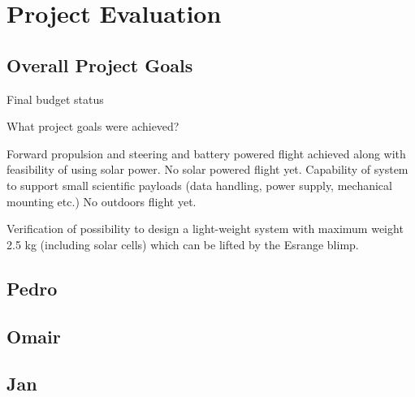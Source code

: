 \newpage
\chapter{Project Evaluation}
\label{chap:evaluation}

\section{Overall Project Goals}

Final budget status

What project goals were achieved?

Forward propulsion and steering and battery powered flight achieved along with feasibility of using solar power. No solar powered flight yet. Capability of system to support small scientific payloads (data handling, power supply, mechanical mounting etc.) No outdoors flight yet.

Verification of possibility to design a light-weight system with maximum weight 2.5 kg (including solar cells) which can be lifted by the Esrange blimp.

\section{Pedro}


\section{Omair}


\section{Jan}


